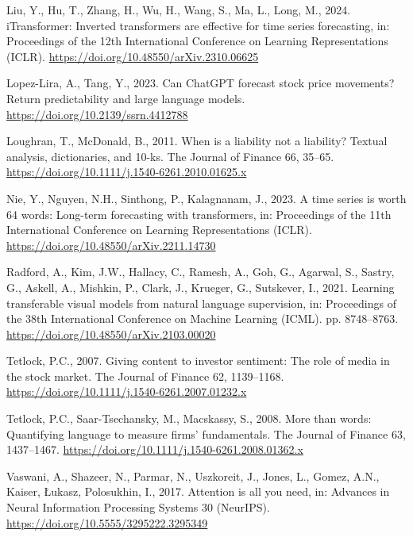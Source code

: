 \documentclass[
  11pt,
  a4paper,
]{article}
\newlength{\cslhangindent}
\newenvironment{CSLReferences}[2] %
 {\begin{list}{}{%
  \setlength{\itemindent}{0pt}
  \setlength{\leftmargin}{0pt}
  \setlength{\parsep}{0pt}
  \ifodd #1
   \setlength{\leftmargin}{\cslhangindent}
   \setlength{\itemindent}{-1\cslhangindent}
  \fi
  \setlength{\itemsep}{#2\baselineskip}}}
 {\end{list}}
\begin{document}
\begin{CSLReferences}{1}{0}
Liu, Y., Hu, T., Zhang, H., Wu, H., Wang, S., Ma, L., Long, M., 2024.
{iTransformer}: Inverted transformers are effective for time series
forecasting, in: Proceedings of the 12th International Conference on
Learning Representations (ICLR).
\url{https://doi.org/10.48550/arXiv.2310.06625}

Lopez-Lira, A., Tang, Y., 2023. Can {ChatGPT} forecast stock price
movements? Return predictability and large language models.
\url{https://doi.org/10.2139/ssrn.4412788}

Loughran, T., McDonald, B., 2011. When is a liability not a liability?
Textual analysis, dictionaries, and 10-ks. The Journal of Finance 66,
35--65. \url{https://doi.org/10.1111/j.1540-6261.2010.01625.x}

Nie, Y., Nguyen, N.H., Sinthong, P., Kalagnanam, J., 2023. A time series
is worth 64 words: Long-term forecasting with transformers, in:
Proceedings of the 11th International Conference on Learning
Representations (ICLR). \url{https://doi.org/10.48550/arXiv.2211.14730}

Radford, A., Kim, J.W., Hallacy, C., Ramesh, A., Goh, G., Agarwal, S.,
Sastry, G., Askell, A., Mishkin, P., Clark, J., Krueger, G., Sutskever,
I., 2021. Learning transferable visual models from natural language
supervision, in: Proceedings of the 38th International Conference on
Machine Learning (ICML). pp. 8748--8763.
\url{https://doi.org/10.48550/arXiv.2103.00020}

Tetlock, P.C., 2007. Giving content to investor sentiment: The role of
media in the stock market. The Journal of Finance 62, 1139--1168.
\url{https://doi.org/10.1111/j.1540-6261.2007.01232.x}

Tetlock, P.C., Saar-Tsechansky, M., Macskassy, S., 2008. More than
words: Quantifying language to measure firms' fundamentals. The Journal
of Finance 63, 1437--1467.
\url{https://doi.org/10.1111/j.1540-6261.2008.01362.x}

Vaswani, A., Shazeer, N., Parmar, N., Uszkoreit, J., Jones, L., Gomez,
A.N., Kaiser, Łukasz, Polosukhin, I., 2017. Attention is all you need,
in: Advances in Neural Information Processing Systems 30 (NeurIPS).
\url{https://doi.org/10.5555/3295222.3295349}


\end{CSLReferences}
\end{document}
